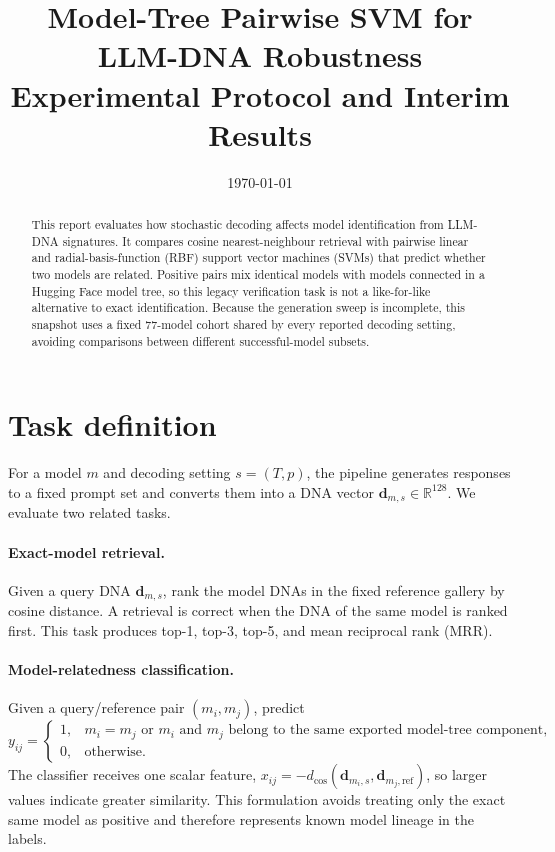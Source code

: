 \documentclass[11pt,a4paper]{article}
\title{Model-Tree Pairwise SVM for LLM-DNA Robustness\\
\large Experimental Protocol and Interim Results}
\author{}
\date{\today}
\begin{document}
\maketitle

\begin{abstract}
This report evaluates how stochastic decoding affects model identification from
LLM-DNA signatures.  It compares cosine nearest-neighbour retrieval with
pairwise linear and radial-basis-function (RBF) support vector machines (SVMs)
that predict whether two models are related. Positive pairs mix identical
models with models connected in a Hugging Face model tree, so this legacy
verification task is not a like-for-like alternative to exact identification.
Because the generation sweep is incomplete, this snapshot
uses a fixed 77-model cohort shared by every reported decoding setting, avoiding
comparisons between different successful-model subsets.
\end{abstract}

\section{Task definition}
For a model $m$ and decoding setting $s=(T,p)$, the pipeline generates responses
to a fixed prompt set and converts them into a DNA vector
$\mathbf{d}_{m,s}\in\mathbb{R}^{128}$.  We evaluate two related tasks.

\paragraph{Exact-model retrieval.}
Given a query DNA $\mathbf{d}_{m,s}$, rank the model DNAs in the fixed reference
gallery by cosine distance.  A retrieval is correct when the DNA of the same
model is ranked first.  This task produces top-1, top-3, top-5, and mean
reciprocal rank (MRR).

\paragraph{Model-relatedness classification.}
Given a query/reference pair $(m_i,m_j)$, predict
\begin{equation}
 y_{ij} =
 \begin{cases}
 1, & m_i=m_j\text{ or }m_i\text{ and }m_j\text{ belong to the same exported model-tree component},\\
 0, & \text{otherwise}.
 \end{cases}
\end{equation}
The classifier receives one scalar feature,
$x_{ij}=-d_{\mathrm{cos}}(\mathbf{d}_{m_i,s},\mathbf{d}_{m_j,\mathrm{ref}})$,
so larger values indicate greater similarity.  This formulation avoids treating
only the exact same model as positive and therefore represents known model
lineage in the labels.
\end{document}
